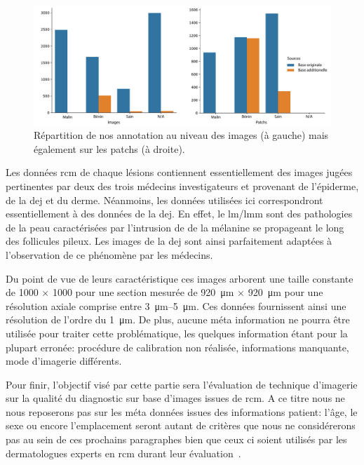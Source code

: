 \begin{figure}[H]
    \begin{center}
        \includegraphics[width=\linewidth]{contents/x_microscopy/resources/scheme_rcm_statistics.pdf}
        \caption{Répartition de nos annotation au niveau des images (à gauche) mais également sur les patchs (à droite).}
        \label{fig:scheme_rcm_statistics}
    \end{center} 
\end{figure}\par

Les données \gls{rcm} de chaque lésions contiennent essentiellement des images jugées pertinentes par deux des trois médecins investigateurs et provenant de l'épiderme, de la \gls{dej} et du derme. Néanmoins, les données utilisées ici correspondront essentiellement à des données de la \gls{dej}. En effet, le \gls{lm}/\gls{lmm} sont des pathologies de la peau caractérisées par l'intrusion de de la mélanine se propageant le long des follicules pileux. Les images de la \gls{dej} sont ainsi parfaitement adaptées à l'observation de ce phénomène par les médecins. \par

Du point de vue de leurs caractéristique ces images arborent une taille constante de \SI{1000}{\px} $\times$ \SI{1000}{\px} pour une section mesurée de \SI{920}{\micro\metre} $\times$ \SI{920}{\micro\metre} pour une résolution axiale comprise entre \SIrange{3}{5}{\micro\metre}. Ces données fournissent ainsi une résolution de l'ordre du \SI{1}{\micro\metre}. De plus, aucune méta information ne pourra être utilisée pour traiter cette problématique, les quelques information étant pour la plupart erronée: procédure de calibration non réalisée, informations manquante, mode d'imagerie différents.\par

Pour finir, l'objectif visé par cette partie sera l'évaluation de technique d'imagerie sur la qualité du diagnostic sur base d'images issues de \gls{rcm}. A ce titre nous ne nous reposerons pas sur les méta données issues des informations patient: l'âge, le sexe ou encore l'emplacement seront autant de critères que nous ne considérerons pas au sein de ces prochains paragraphes bien que ceux ci soient utilisés par les dermatologues experts en \gls{rcm} durant leur évaluation~\cite{Cinotti2018}.\par

